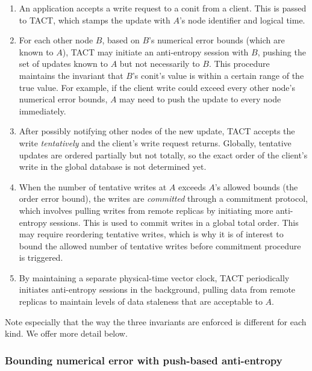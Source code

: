 \begin{enumerate}
   \item An application accepts a write request to a conit from a client. This
     is passed to TACT, which stamps the update with $A$'s node identifier and
     logical time.
   \item For each other node $B$, based on $B$'s numerical error bounds (which
     are known to $A$), TACT may initiate an anti-entropy session with $B$,
     pushing the set of updates known to $A$ but not necessarily to $B$. This
     procedure maintains the invariant that $B$'s conit's value is within a
     certain range of the true value. For example, if the client write could
     exceed every other node's numerical error bounds, $A$ may need to push the
     update to every node immediately.
   \item After possibly notifying other nodes of the new update, TACT accepts
     the write \emph{tentatively} and the client's write request returns.
     Globally, tentative updates are ordered partially but not totally, so the
     exact order of the client's write in the global database is not determined
     yet.
   \item When the number of tentative writes at $A$ exceeds $A$'s allowed bounds
     (the order error bound), the writes are \emph{committed} through a
     commitment protocol, which involves pulling writes from remote replicas by
     initiating more anti-entropy sessions. This is used to commit writes in a
     global total order. This may require reordering tentative writes, which is
     why it is of interest to bound the allowed number of tentative writes
     before commitment procedure is triggered.
   \item By maintaining a separate physical-time vector clock, TACT periodically
     initiates anti-entropy sessions in the background, pulling data from remote
     replicas to maintain levels of data staleness that are acceptable to $A$.
\end{enumerate}

Note especially that the way the three invariants are enforced is different for
each kind. We offer more detail below.


\subsubsection{Bounding numerical error with push-based anti-entropy}

